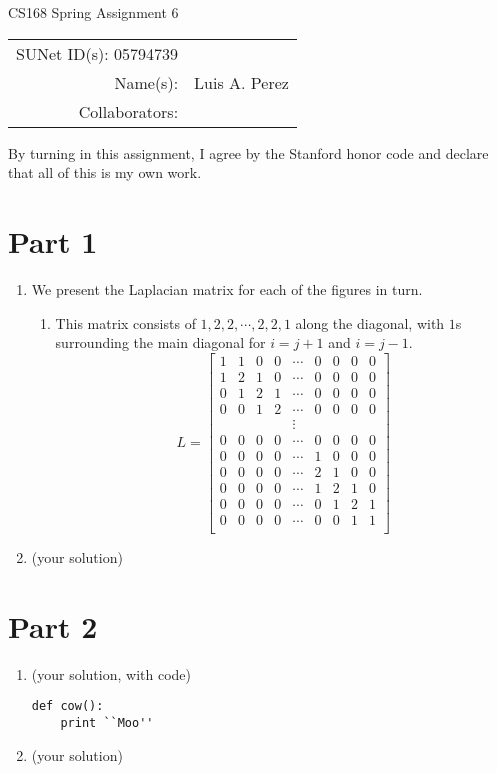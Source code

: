 \documentclass[12pt]{article}
\begin{document}
\begin{center}
{\Large CS168 Spring Assignment 6}

\begin{tabular}{rl}
SUNet ID(s): 05794739 & \\
Name(s): & Luis A. Perez \\
Collaborators: &
\end{tabular}
\end{center}

By turning in this assignment, I agree by the Stanford honor code and declare
that all of this is my own work.

\section*{Part 1}

\begin{enumerate}[label=(\alph*)]
  \item We present the Laplacian matrix for each of the figures in turn.

    \begin{enumerate}[label=(\alpha*)]
      \item
        This matrix consists of $1, 2, 2, \cdots, 2, 2, 1$ along the diagonal, with $1$s surrounding the main diagonal for $i = j + 1$ and $i = j - 1$.
        \[
          L = \begin{bmatrix}
            1 & 1 & 0 & 0 & \cdots & 0 & 0 & 0 & 0 \\
            1 & 2 & 1 & 0 & \cdots & 0 & 0 & 0 & 0 \\
            0 & 1 & 2 & 1 & \cdots & 0 & 0 & 0 & 0 \\
            0 & 0 & 1 & 2 & \cdots & 0 & 0 & 0 & 0 \\
              &   &   &   & \vdots &   &   &   &   \\
            0 & 0 & 0 & 0 & \cdots & 0 & 0 & 0 & 0  \\
            0 & 0 & 0 & 0 & \cdots & 1 & 0 & 0 & 0  \\
            0 & 0 & 0 & 0 & \cdots & 2 & 1 & 0 & 0  \\
            0 & 0 & 0 & 0 & \cdots & 1 & 2 & 1 & 0  \\
            0 & 0 & 0 & 0 & \cdots & 0 & 1 & 2 & 1  \\
            0 & 0 & 0 & 0 & \cdots & 0 & 0 & 1 & 1  \\
          \end{bmatrix}
        \]
    
    \end{enumerate}
  \item (your solution)
\end{enumerate}

\section*{Part 2}

\begin{enumerate}[label=(\alph*)]
  \item (your solution, with code)
\begin{verbatim}
def cow():
    print ``Moo''
\end{verbatim}

  \item (your solution)
\end{enumerate}
\end{document}
